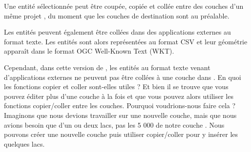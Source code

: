 


Une entité sélectionnée peut être coupée, copiée et collée entre des couches d'un même projet \qg, du moment que les couches de destination sont  au préalable.

Les entités peuvent également être collées dans des applications externes au format texte. Les entités sont alors représentées au format CSV et leur géométrie apparaît dans le format OGC Well-Known Text (WKT).

Cependant, dans cette version de \qg, les entités au format texte venant d'applications externes ne peuvent pas être collées à une couche dans \qg. En quoi les fonctions copier et coller sont-elles utiles ? Et bien il se trouve que vous pouvez éditer plus d'une couche à la fois et que vous pouvez alors utiliser les fonctions copier/coller entre les couches. Pourquoi voudrions-nous faire cela ? Imaginons que nous devions travailler sur une nouvelle couche, mais que nous avions besoin que d'un ou deux lacs, pas les 5 000 de notre couche . Nous pouvons créer une nouvelle couche puis utiliser copier/coller pour y insérer les quelques lacs.

